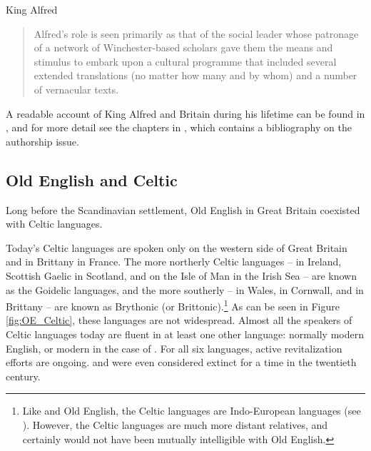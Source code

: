 \begin{peoplebox}{King Alfred}
\begin{quote}
    Alfred's role is seen primarily as that of the social leader whose patronage of a network of Winchester-based scholars gave them the means and stimulus to embark upon a cultural programme that included several extended translations (no matter how many and by whom) and a number of vernacular texts.
\end{quote}

A readable account of King Alfred and Britain during his lifetime can be found in \citet{Adams2017}, and for more detail see the chapters in \citet{DiscenzaSzarmach2015}, which contains a bibliography on the authorship issue.
\end{peoplebox}


\subsection{Old English and Celtic}\label{OE-Celtic}

Long before the Scandinavian settlement, Old English in Great Britain coexisted with Celtic languages.

Today's Celtic languages are spoken only on the western side of Great Britain and in Brittany in France. The more northerly Celtic languages --  in Ireland, Scottish Gaelic in Scotland, and  on the Isle of Man in the Irish Sea -- are known as the Goidelic languages, and the more southerly --  in Wales,  in Cornwall, and  in Brittany -- are known as Brythonic (or Brittonic).\footnote{Like  and Old English, the Celtic languages are Indo-European languages (see ). However, the Celtic languages are much more distant relatives, and certainly would not have been mutually intelligible with Old English.} As can be seen in Figure \ref{fig:OE_Celtic}, these languages are not widespread. Almost all the speakers of Celtic languages today are fluent in at least one other language: normally modern English, or modern  in the case of . For all six languages, active revitalization efforts are ongoing.  and  were even considered extinct for a time in the twentieth century.

